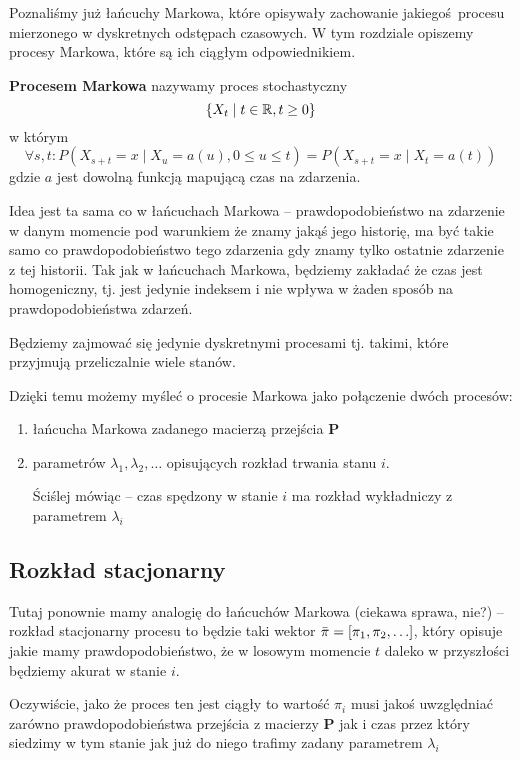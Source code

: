 Poznaliśmy już łańcuchy Markowa, które opisywały zachowanie jakiegoś procesu mierzonego w dyskretnych odstępach czasowych.
W tym rozdziale opiszemy procesy Markowa, które są ich ciągłym odpowiednikiem.

\begin{definition}
    \textbf{Procesem Markowa} nazywamy proces stochastyczny\[\set{X_t \mid t \in \real, t \geq 0} \] w którym
    \[
        \forall s, t: P(X_{s + t} = x \mid X_u = a(u), 0 \leq u \leq t) = P(X_{s + t} = x \mid X_t = a(t))
    \]
    gdzie \( a \) jest dowolną funkcją mapującą czas na zdarzenia.
\end{definition}

Idea jest ta sama co w łańcuchach Markowa -- prawdopodobieństwo na zdarzenie w danym momencie
pod warunkiem że znamy jakąś jego historię, ma być takie samo co prawdopodobieństwo tego zdarzenia gdy znamy tylko ostatnie zdarzenie z tej historii. 
Tak jak w łańcuchach Markowa, będziemy zakładać że czas jest homogeniczny, tj. jest jedynie indeksem i nie wpływa w żaden sposób na prawdopodobieństwa zdarzeń.

Będziemy zajmować się jedynie dyskretnymi procesami tj. takimi, które przyjmują przeliczalnie wiele stanów.

Dzięki temu możemy myśleć o procesie Markowa jako połączenie dwóch procesów:
\begin{enumerate}
    \item łańcucha Markowa zadanego macierzą przejścia \( \mathbf{P} \)
    \item parametrów \( \lambda_1, \lambda_2, \dots \) opisujących rozkład trwania stanu \( i \).
    
    Ściślej mówiąc -- czas spędzony w stanie \( i \) ma rozkład wykładniczy z parametrem \( \lambda_i \)
\end{enumerate}

\subsection{Rozkład stacjonarny}
Tutaj ponownie mamy analogię do łańcuchów Markowa (ciekawa sprawa, nie?) -- rozkład stacjonarny 
procesu to będzie taki wektor \( \bar \pi = \brackets{\pi_1, \pi_2, \dots} \), który opisuje jakie mamy prawdopodobieństwo,
że w losowym momencie \( t \) daleko w przyszłości będziemy akurat w stanie \( i \).

Oczywiście, jako że proces ten jest ciągły to wartość \( \pi_i \) musi jakoś uwzględniać zarówno prawdopodobieństwa przejścia z macierzy \( \mathbf{P} \) jak i czas przez który siedzimy w tym stanie jak już do niego trafimy zadany parametrem \( \lambda_i \)

